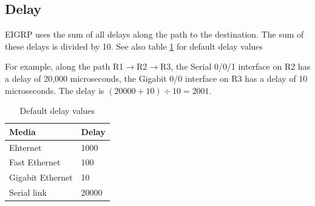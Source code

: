 \subsection{Delay}
EIGRP uses the sum of all delays along the path to the destination. The sum of these delays is divided by 10. See also table \ref{delay-value} for default delay values \par 
For example, along the path R1$\rightarrow$R2$\rightarrow$R3, the Serial 0/0/1 interface on R2 has a delay of 20,000 microseconds, the Gigabit 0/0 interface on R3 has a delay of 10 microseconds. The delay is $ \left( 20000 + 10 \right) \div 10 = 2001 $.
\begin{table}[h!]
\centering
\caption{Default delay values}
\label{delay-value}
\begin{tabular}{|l|l|}
\hline
Media            & Delay \\ \hline
Ehternet         & 1000  \\ \hline
Fast Ethernet    & 100   \\ \hline
Gigabit Ethernet & 10    \\ \hline
Serial link      & 20000 \\ \hline
\end{tabular}
\end{table}
